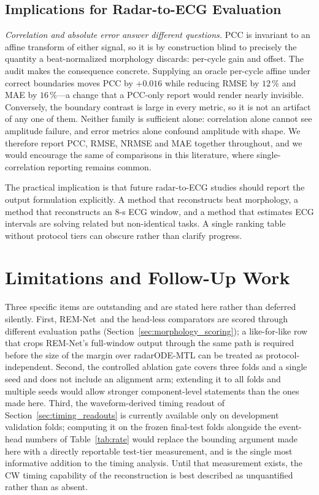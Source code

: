 \documentclass[lettersize,journal]{IEEEtran}
\newcommand{\remnet}{REM-Net\xspace}
\begin{document}
\subsection{Implications for Radar-to-ECG Evaluation}
\emph{Correlation and absolute error answer different questions.} PCC is invariant to an affine transform of either signal, so it is by construction blind to precisely the quantity a beat-normalized morphology discards: per-cycle gain and offset. The audit makes the consequence concrete. Supplying an oracle per-cycle affine under correct boundaries moves PCC by $+0.016$ while reducing RMSE by $12\,\%$ and MAE by $16\,\%$---a change that a PCC-only report would render nearly invisible. Conversely, the boundary contrast is large in every metric, so it is not an artifact of any one of them. Neither family is sufficient alone: correlation alone cannot see amplitude failure, and error metrics alone confound amplitude with shape. We therefore report PCC, RMSE, NRMSE and MAE together throughout, and we would encourage the same of comparisons in this literature, where single-correlation reporting remains common.

The practical implication is that future radar-to-ECG studies should report the output formulation explicitly. A method that reconstructs beat morphology, a method that reconstructs an 8-s ECG window, and a method that estimates ECG intervals are solving related but non-identical tasks. A single ranking table without protocol tiers can obscure rather than clarify progress.

\section{Limitations and Follow-Up Work}
\label{sec:limitations}
Three specific items are outstanding and are stated here rather than deferred silently.
First, \remnet\ and the head-less comparators are scored through different evaluation
paths (Section~\ref{sec:morphology_scoring}); a like-for-like row that crops \remnet's
full-window output through the same path is required before the size of the margin over
radarODE-MTL can be treated as protocol-independent. Second, the controlled ablation gate
covers three folds and a single seed and does not include an alignment arm; extending it
to all folds and multiple seeds would allow stronger component-level statements than the
ones made here. Third, the waveform-derived timing readout of
Section~\ref{sec:timing_readouts} is currently available only on development validation
folds; computing it on the frozen final-test folds alongside the event-head numbers of
Table~\ref{tab:rate} would replace the bounding argument made here with a directly
reportable test-tier measurement, and is the single most informative addition to the
timing analysis. Until that measurement exists, the CW timing capability of the
reconstruction is best described as unquantified rather than as absent.
\end{document}
